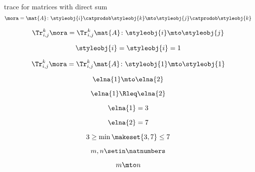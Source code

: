 {\begin{forslides}
    trace for matrices with direct sum
    \begin{equation}
        \label{eq:feedback-006}
        \mora = \mat{A} \colon \styleobj{i} \catprodob \styleobj{k} \mto \styleobj{j} \catprodob \styleobj{k}
    \end{equation}

    \begin{equation}
        \label{eq:feedback-007}
        \Tr_{i,j}^{k} \mora = \Tr_{i,j}^{k} \mat{A} \colon \styleobj{i} \mto \styleobj{j}
    \end{equation}

    \begin{equation}
        \label{eq:feedback-008}
        \styleobj{i} = \styleobj{i} = 1
    \end{equation}

    \begin{equation}
        \label{eq:feedback-009}
        \Tr_{i,j}^{k} \mora = \Tr_{i,j}^{k} \mat{A} \colon \styleobj{1} \mto \styleobj{1}
    \end{equation}

    \begin{equation}
        \label{eq:feedback-010}
        \elna{1} \mto \elna{2}
    \end{equation}

    \begin{equation}
        \label{eq:feedback-011}
        \elna{1}\Rleq \elna{2}
    \end{equation}

    \begin{equation}
        \label{eq:feedback-012}
        \elna{1} = 3
    \end{equation}

    \begin{equation}
        \label{eq:feedback-013}
        \elna{2} = 7
    \end{equation}

    \begin{equation}
        \label{eq:feedback-014}
        3 \geq \min \makeset{3, 7} \leq 7
    \end{equation}

    \begin{equation}
        \label{eq:feedback-015}
        m, n \setin \natnumbers
    \end{equation}

    \begin{equation}
        \label{eq:feedback-016}
        m \mto n
    \end{equation}


\end{forslides}}
